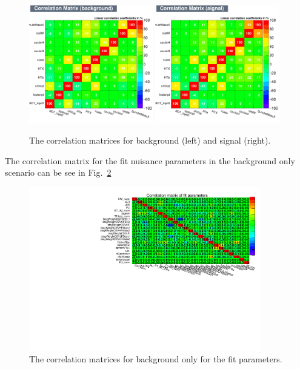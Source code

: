 \begin{figure}[ht!]
    \includegraphics[width=0.48\textwidth]{images/Run2/CorrelationMatrixB.pdf}
    \includegraphics[width=0.48\textwidth]{images/Run2/CorrelationMatrixS.pdf}
    \caption{The correlation matrices for background (left) and signal (right).}
    \label{fig:corrMat}
\end{figure}

The correlation matrix for the fit nuisance parameters in the background only scenario can be see in Fig.~\ref{fig:FitCorr}

\begin{figure}[ht!]
    \includegraphics[width=0.9\textwidth]{images/Run2/FitCorr.pdf}
    \caption{The correlation matrices for background only for the fit parameters.}
    \label{fig:FitCorr}
\end{figure}

